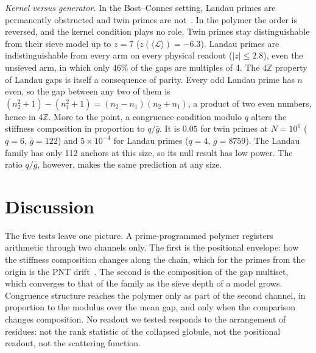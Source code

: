 \documentclass[reprint,amsmath,amssymb,aps,pre,longbibliography]{revtex4-2}
\begin{document}
\emph{Kernel versus generator.} In the Bost--Connes setting, Landau primes are permanently
obstructed and twin primes are not~\cite[Ch.~37, Thm.~2.2]{LBCS}. In the polymer the order is
reversed, and the kernel condition plays no role. Twin primes stay distinguishable from their
sieve model up to $z=7$ ($z(\langle\mathcal L\rangle)=-6.3$). Landau primes are indistinguishable
from every arm on every physical readout ($|z|\le2.8$), even the unsieved arm, in which only
$46\%$ of the gaps are multiples of 4. The $4\mathbb Z$ property of Landau gaps is itself a
consequence of parity. Every odd Landau prime has $n$ even, so the gap between any two of them is
$(n_2^2+1)-(n_1^2+1)=(n_2-n_1)(n_2+n_1)$, a product of two even numbers, hence in $4\mathbb Z$. More to the point, a congruence
condition modulo $q$ alters the stiffness composition in proportion to $q/\bar g$. It is $0.05$
for twin primes at $N=10^6$ ($q=6$, $\bar g=122$) and $5\times10^{-4}$ for Landau primes ($q=4$,
$\bar g=8759$). The Landau family has only 112 anchors at this size, so its null result has low
power. The ratio $q/\bar g$, however, makes the same prediction at any size.

\section{Discussion}\label{sec:disc}

The five tests leave one picture. A prime-programmed polymer registers arithmetic through two
channels only. The first is the positional envelope: how the stiffness composition changes along
the chain, which for the primes from the origin is the PNT drift~\cite{PDTP4,Merged}. The second
is the composition of the gap multiset, which converges to that of the family as the sieve
depth of a model grows. Congruence structure reaches the polymer only as part of the second
channel, in proportion to the modulus over the mean gap, and only when the comparison changes
composition. No readout we tested responds to the arrangement of residues: not the rank
statistic of the collapsed globule, not the positional readout, not the scattering function.
\end{document}
